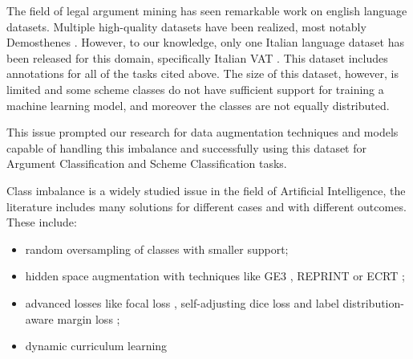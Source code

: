 \documentclass[11pt]{article}
\begin{document}

The field of legal argument mining has seen remarkable work on english language datasets. Multiple high-quality datasets have been realized, most notably Demosthenes \cite{grundler-etal-2022-detecting}.
However, to our knowledge, only one Italian language dataset has been released for this domain, specifically Italian VAT \cite{galli2022}. This dataset includes annotations for all of the tasks cited above. The size of this dataset, however, is limited and some scheme classes do not have sufficient support for training a machine learning model, and moreover the classes are not equally distributed.

This issue prompted our research for data augmentation techniques and models capable of handling this imbalance and successfully using this dataset for Argument Classification and Scheme Classification tasks.

Class imbalance is a widely studied issue in the field of Artificial Intelligence, the literature includes many solutions for different cases and with different outcomes\cite{henning-etal-2023-survey}. These include:
\begin{itemize}
    \item random oversampling of classes with smaller support;
    \item hidden space augmentation with techniques like GE3 \cite{wei-2021-good}, REPRINT \cite{Wei2022ReprintAR} or ECRT \cite{NEURIPS2021_b151ce49};
    \item advanced losses like focal loss \cite{lin2018focallossdenseobject}, self-adjusting dice loss \cite{li2020dicelossdataimbalancednlp} and label distribution-aware margin loss \cite{cao2019learningimbalanceddatasetslabeldistributionaware};
    \item dynamic curriculum learning \cite{wang2019dynamiccurriculumlearningimbalanced}
\end{itemize}
\end{document}
